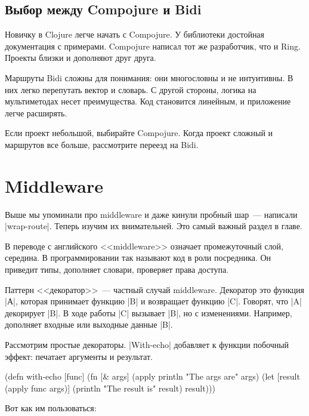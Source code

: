 \subsection{Выбор между Compojure и Bidi}

Новичку в Clojure легче начать с Compojure. У библиотеки достойная документация
с примерами. Compojure написал тот же разработчик, что и Ring. Проекты близки и
дополняют друг друга.

Маршруты Bidi сложны для понимания: они многословны и не интуитивны. В них легко
перепутать вектор и словарь. С другой стороны, логика на мультиметодах несет
преимущества. Код становится линейным, и приложение легче расширять.

Если проект небольшой, выбирайте Compojure. Когда проект сложный и маршрутов все
больше, рассмотрите переезд на Bidi.

\section{Middleware}

Выше мы упоминали про middleware и даже кинули пробный шар~--- написали
\spverb|wrap-route|. Теперь изучим их внимательней. Это самый важный раздел в
главе.

В переводе с английского <<middleware>> означает промежуточный слой, середина. В
программировании так называют код в роли посредника. Он приведит типы, дополняет
словари, проверяет права доступа.

\label{decorator}

Паттерн <<декоратор>>~--- частный случай middleware. Декоратор это функция
\spverb|А|, которая принимает функцию \spverb|B| и возвращает функцию
\spverb|C|. Говорят, что \spverb|A| декорирует \spverb|B|. В ходе работы
\spverb|C| вызывает \spverb|B|, но с изменениями. Например, дополняет входные
или выходные данные \spverb|B|.

Рассмотрим простые декораторы. \spverb|With-echo| добавляет к функции побочный
эффект: печатает аргументы и результат.

\begin{english}
  \begin{clojure}
(defn with-echo [func]
  (fn [& args]
    (apply println "The args are" args)
    (let [result (apply func args)]
      (println "The result is" result)
      result)))
  \end{clojure}
\end{english}

Вот как им пользоваться:

